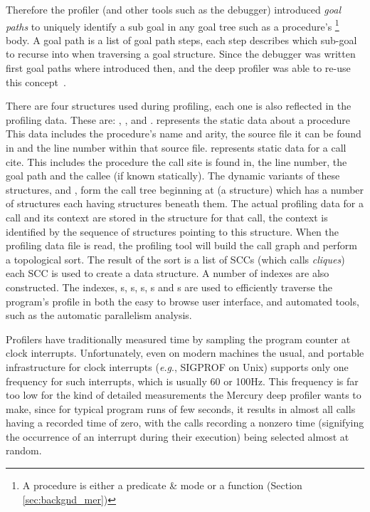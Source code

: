 Therefore the profiler
(and other tools such as the debugger) introduced \emph{goal paths}
to uniquely identify a sub goal in any goal tree such as a procedure's%
\footnote{
A procedure is either a predicate \& mode or a function (Section
\ref{sec:backgnd_mer})}
body.
A goal path is a list of goal path steps, each step describes which
sub-goal to recurse into when traversing a goal structure.
Since the debugger was written first goal paths where introduced then,
and the deep profiler was able to re-use this concept~\cite{mdb}.

There are four structures used during profiling,
each one is also reflected in the profiling data.
These are: {\PS}, {\PD}, {\CSS} and {\CSD}.
{\PS} represents the static data about a procedure
This data includes the procedure's name and arity,
the source file it can be found in and the line number within that source file.
\CSS represents static data for a call cite.
This includes the procedure the call site is found in, the line number,
the goal path and the callee (if known statically).
The dynamic variants of these structures, \PD and {\CSD},
form the call tree beginning at  (a \PD structure)
which has a number of \CSD structures each having \PD structures
beneath them.
The actual profiling data for a call and its context are stored in
the \CSD structure for that call,
the context is identified by the sequence of structures pointing to this
structure.
When the profiling data file is read,
the profiling tool will build the call graph and perform a topological
sort.
The result of the sort is a list of SCCs
(which \citet{conway-deep} calls \emph{cliques})
each SCC is used to create a \Clique data structure.
A number of indexes are also constructed.
The indexes, {\Clique}s, {\PS}s, {\PD}s, {\CSS}s and {\CSD}s are used to
efficiently traverse the program's profile in both
the easy to browse user interface,
and automated tools, such as the automatic parallelism analysis.

Profilers have traditionally measured time
by sampling the program counter at clock interrupts.
Unfortunately, even on modern machines
the usual, and portable infrastructure for clock interrupts
(\emph{e.g}., SIGPROF on Unix)
supports only one frequency for such interrupts,
which is usually 60 or 100Hz.
This frequency is far too low for the kind of detailed measurements
the Mercury deep profiler wants to make,
since for typical program runs of few seconds,
it results in almost all calls having a recorded time of zero,
with the calls recording a nonzero time
(signifying the occurrence of an interrupt during their execution)
being selected almost at random.

